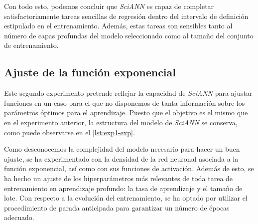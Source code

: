 Con todo esto, podemos concluir que \textit{SciANN} es capaz de completar satisfactoriamente tareas sencillas de regresión dentro del intervalo de definición estipulado en el entrenamiento. Además, estas tareas son sensibles tanto al número de capas profundas del modelo seleccionado como al tamaño del conjunto de entrenamiento. 

\subsection{Ajuste de la función exponencial}
Este segundo experimento pretende reflejar la capacidad de \textit{SciANN} para ajustar funciones en un caso para el que no disponemos de tanta información sobre los parámetros óptimos para el aprendizaje. Puesto que el objetivo es el mismo que en el experimento anterior, la estructura del modelo de \textit{SciANN} se conserva, como puede observarse en el \autoref{lst:exp1-exp}. 

Como desconocemos la complejidad del modelo necesario para hacer un buen ajuste, se ha experimentado con la densidad de la red neuronal asociada a la función exponencial, así como con sus funciones de activación. Además de esto, se ha hecho un ajuste de los hiperparámetros más relevantes de toda tarea de entrenamiento en aprendizaje profundo: la tasa de aprendizaje y el tamaño de lote. Con respecto a la evolución del entrenamiento, se ha optado por utilizar el procedimiento de parada anticipada para garantizar un número de épocas adecuado.





